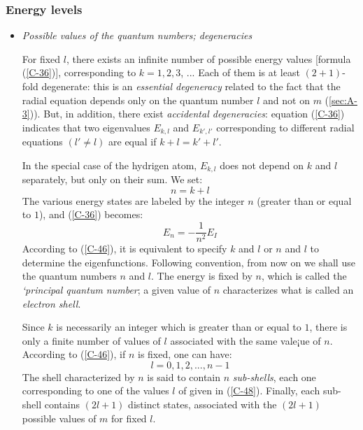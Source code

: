 \subsubsection{Energy levels}
\begin{itemize}
	\item \textit{Possible values of the quantum numbers; degeneracies}


		For fixed $l$, there exists an infinite number of possible energy values [formula (\ref{C-36})], corresponding to $k= 1, 2, 3$, ... Each of them is at least $(2 + 1)$-fold degenerate: this is an \textit{essential degeneracy} related to the fact that the radial equation depends only on the quantum number $l$ and not on $m$ (\ref{sec:A-3})). But, in addition, there exist \textit{accidental degeneracies}: equation (\ref{C-36}) indicates that two eigenvalues $E_{k,l}$ and $E_{k',l'}$ corresponding to different radial equations $(l'\neq l)$ are equal if $k+l=k'+l'$. 

		In the special case of the hydrigen atom, $E_{k,l}$ does not depend on $k$ and $l$ separately, but only on their sum. We set:
		\begin{equation}\label{C-46}
	n = k+l
\end{equation}
The various energy states are labeled by the integer $n$ (greater than or equal to $1$), and (\ref{C-36}) becomes:
\begin{equation}\label{C-47}
	E_n=-\frac{1}{n^2}E_I
\end{equation}
According to (\ref{C-46}), it is equivalent to specify $k$ and $l$ or $n$ and $l$ to determine the eigenfunctions. Following convention, from now on we shall use the quantum numbers $n$ and $l$. The energy is fixed by $n$, which is called the \textit{`principal quantum number}; a given value of $n$ characterizes what is called an \textit{electron shell}.

Since $k$ is necessarily an integer which is greater than or equal to $1$, there is only a finite number of values of $l$ associated with the same vale¡ue of $n$. According to (\ref{C-46}), if $n$ is fixed, one can have:
\begin{equation}\label{C-48}
	l=0,1,2,...,n-1
\end{equation}
The shell characterized by $n$ is said to contain $n$ \textit{sub-shells}, each one corresponding to one of the values $l$ of given in (\ref{C-48}). Finally, each sub-shell contains $(2l+1)$ distinct states, associated with the $(2l+1)$ possible values of $m$ for fixed $l$.


\end{itemize}
